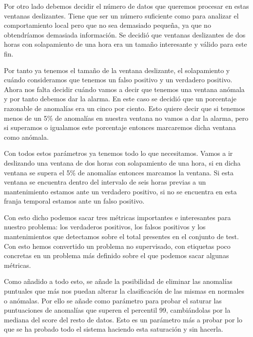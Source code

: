 Por otro lado debemos decidir el número de datos que queremos procesar en estas ventanas deslizantes. Tiene que ser un número suficiente como para analizar el comportamiento local pero que no sea demasiado pequeña, ya que no obtendríamos demasiada información. Se decidió que ventanas deslizantes de dos horas con solapamiento de una hora era un tamaño interesante y válido para este fin.

Por tanto ya tenemos el tamaño de la ventana deslizante, el solapamiento y cuándo consideramos que tenemos un falso positivo y un verdadero positivo. Ahora nos falta decidir cuándo vamos a decir que tenemos una ventana anómala y por tanto debemos dar la alarma. En este caso se decidió que un porcentaje razonable de anomalías era un cinco por ciento. Esto quiere decir que si tenemos menos de un 5\% de anomalías en nuestra ventana no vamos a dar la alarma, pero si superamos o igualamos este porcentaje entonces marcaremos dicha ventana como anómala.

Con todos estos parámetros ya tenemos todo lo que necesitamos. Vamos a ir deslizando una ventana de dos horas con solapamiento de una hora, si en dicha ventana se supera el 5\% de anomalías entonces marcamos la ventana. Si esta ventana se encuentra dentro del intervalo de seis horas previas a un mantenimiento estamos ante un verdadero positivo, si no se encuentra en esta franja temporal estamos ante un falso positivo.

Con esto dicho podemos sacar tres métricas importantes e interesantes para nuestro problema: los verdaderos positivos, los falsos positivos y los mantenimientos que detectamos sobre el total presentes en el conjunto de test. Con esto hemos convertido un problema no supervisado, con etiquetas poco concretas en un problema más definido sobre el que podemos sacar algunas métricas.

Como añadido a todo esto, se añade la posibilidad de eliminar las anomalías puntuales que más nos puedan alterar la clasificación de las mismas en normales o anómalas. Por ello se añade como parámetro para probar el saturar las puntuaciones de anomalías que superen el percentil 99, cambiándolas por la mediana del score del resto de datos. Esto es un parámetro más a probar por lo que se ha probado todo el sistema haciendo esta saturación y sin hacerla.